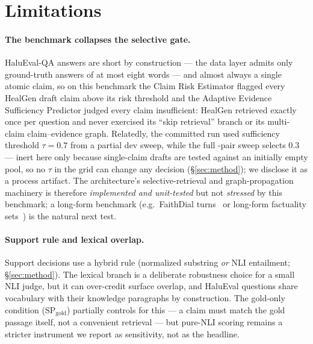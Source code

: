 ﻿%
\section{Limitations}
\label{sec:limitations}

\paragraph{The benchmark collapses the selective gate.}
HaluEval-QA answers are short by construction --- the data layer admits
only ground-truth answers of at most eight words --- and almost always a
single atomic claim, so on this benchmark the Claim Risk Estimator flagged every
HealGen draft claim above its risk threshold and the Adaptive Evidence
Sufficiency Predictor judged every claim insufficient: HealGen retrieved
exactly once per question and never exercised its ``skip retrieval''
branch or its multi-claim claim--evidence graph.  Relatedly, the
committed run used sufficiency threshold $\tau{=}0.7$ from a partial dev
sweep, while the full \NTauPairs-pair sweep selects $0.3$ --- inert here only
because single-claim drafts are tested against an initially empty pool,
so no $\tau$ in the grid can change any decision
(\S\ref{sec:method}); we disclose it as a process artifact.  The architecture's
selective-retrieval and graph-propagation machinery is therefore
\emph{implemented and unit-tested} but not \emph{stressed} by this
benchmark; a long-form benchmark (e.g.\ FaithDial
turns~\cite{dziri2022faithdial} or long-form factuality
sets~\cite{wei2024longformfactuality}) is the natural next test.

\paragraph{Support rule and lexical overlap.}
Support decisions use a hybrid rule (normalized substring
\emph{or} NLI entailment; \S\ref{sec:method}).  The lexical branch is a
deliberate robustness choice for a small NLI judge, but it can
over-credit surface overlap, and HaluEval questions share vocabulary
with their knowledge paragraphs by construction.  The gold-only
condition (SP$_{\text{gold}}$) partially controls for this --- a claim
must match the gold passage itself, not a convenient retrieval --- but
pure-NLI scoring remains a stricter instrument we report as sensitivity,
not as the headline.

